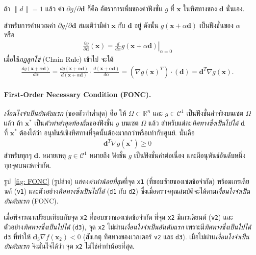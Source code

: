 ถ้า $\| d \| = 1$ แล้ว ค่า $\partial g/\partial \mathbf{d}$ ก็คือ อัตราการเพิ่มของค่าฟังชั่น $g$ ที่ $\mathbf{x}$ ในทิศทางของ $\mathbf{d}$ นั่นเอง.

สำหรับการคำนวณค่า $\partial g/\partial \mathbf{d}$ 
สมมติว่ามีค่า $\mathbf{x}$ กับ $\mathbf{d}$ อยู่ 
ดังนั้น $g(\mathbf{x} + \alpha \mathbf{d})$ เป็นฟังชั่นของ $\alpha$ หรือ
\begin{eqnarray}
   \frac{\partial g}{\partial \mathbf{d}} (\mathbf{x}) =
   \left. 
   \frac{d}{d \alpha} g(\mathbf{x} + \alpha \mathbf{d}) 
   \right|_{\alpha=0}
\nonumber
\end{eqnarray}
เมื่อใช้\textit{กฏลูกโซ่} (Chain Rule) เข้าไป จะได้
\begin{eqnarray}
\frac{d g(\mathbf{x} + \alpha \mathbf{d})}{d \alpha}
=
\frac{d g(\mathbf{x} + \alpha \mathbf{d})}{d (\mathbf{x} + \alpha \mathbf{d})} \cdot \frac{d (\mathbf{x} + \alpha \mathbf{d})}{d \alpha} 
= (\nabla g(\mathbf{x})^T) \cdot (\mathbf{d}) = \mathbf{d}^T \nabla g(\mathbf{x}).
\nonumber
\end{eqnarray}

\paragraph{First-Order Necessary Condition (FONC).} \textit{เงื่อนไงจำเป็นอันดับแรก} (ของตัวทำต่ำสุด) คือ
ให้ $\Omega \subset \mathbb{R}^n$ และ $g \in \mathcal{C}^1$ เป็นฟังชั่นค่าจริงบนเซต $\Omega$ แล้ว
ถ้า $\mathbf{x}^*$ เป็น\textit{ตัวทำต่ำสุดท้องถิ่น}ของฟังชั่น $g$ บนเซต $\Omega$ แล้ว 
สำหรับแต่ละ\textit{ทิศทางซึ่งเป็นไปได้} $\mathbf{d}$ ที่ $\mathbf{x}^*$ ต้องได้ว่า
อนุพันธ์เชิงทิศทางที่จุดนั้นต้องมากกว่าหรือเท่ากับศูนย์. 
นั่นคือ
\begin{eqnarray}
   \mathbf{d}^T \nabla g(\mathbf{x}^*) \geq 0
\label{eq: FONC}
\end{eqnarray}
สำหรับทุกๆ $\mathbf{d}$.
หมายเหตุ $g \in \mathcal{C}^1$ หมายถึง ฟังชั่น $g$ เป็นฟังชั่นค่าต่อเนื่อง และมีอนุพันธ์อันดับหนึ่งทุกจุดบนเซตจำกัด.

รูป~\ref{fig: FONC} (รูปล่าง) แสดง\textit{ค่าทำน้อยที่สุด}ที่จุด \texttt{x1} (ที่ขอบซ้ายของเซตข้อจำกัด) พร้อมเกรเดียนต์ (\texttt{v1}) และตัวอย่าง\textit{ทิศทางซึ่งเป็นไปได้} (\texttt{d1} กับ \texttt{d2}) ซึ่งเมื่อตรวจคุณสมบัติจะได้ตาม\textit{เงื่อนไงจำเป็นอันดับแรก} (FONC).

เมื่อพิจารณาเปรียบเทียบกับจุด \texttt{x2} ที่ขอบขวาของเซตข้อจำกัด 
ที่จุด \texttt{x2} มีเกรเดียนต์ (\texttt{v2}) 
และตัวอย่าง\textit{ทิศทางซึ่งเป็นไปได้} (\texttt{d3}),
จุด \texttt{x2} ไม่ผ่าน\textit{เงื่อนไงจำเป็นอันดับแรก} เพราะมี\textit{ทิศทางซึ่งเป็นไปได้} \texttt{d3} ที่ทำให้ $\mathbf{d}_3 \nabla f(\mathbf{x}_2) < 0$ (สังเกตุ ทิศทางของเวกเตอร์ \texttt{v2} และ \texttt{d3}).
เมื่อไม่ผ่าน\textit{เงื่อนไงจำเป็นอันดับแรก} จึงมั่นใจได้ว่า จุด \texttt{x2} ไม่ใช่ค่าทำน้อยที่สุด.


